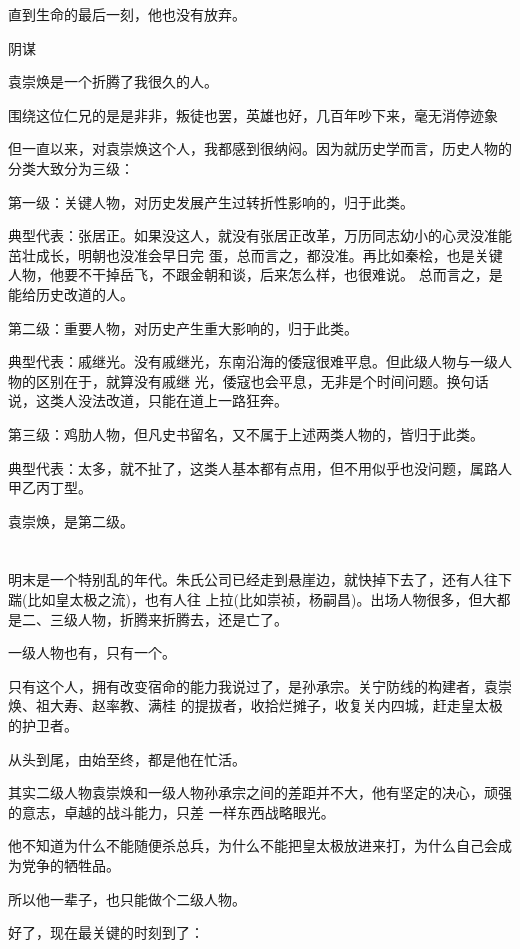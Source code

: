 \documentclass[11pt,a4paper,onecolumn]{article}
\begin{document}
直到生命的最后一刻，他也没有放弃。

阴谋

袁崇焕是一个折腾了我很久的人。

围绕这位仁兄的是是非非，叛徒也罢，英雄也好，几百年吵下来，毫无消停迹象

但一直以来，对袁崇焕这个人，我都感到很纳闷。因为就历史学而言，历史人物的分类大致分为三级：

第一级：关键人物，对历史发展产生过转折性影响的，归于此类。

典型代表：张居正。如果没这人，就没有张居正改革，万历同志幼小的心灵没准能茁壮成长，明朝也没准会早日完
蛋，总而言之，都没准。再比如秦桧，也是关键人物，他要不干掉岳飞，不跟金朝和谈，后来怎么样，也很难说。
总而言之，是能给历史改道的人。

第二级：重要人物，对历史产生重大影响的，归于此类。

典型代表：戚继光。没有戚继光，东南沿海的倭寇很难平息。但此级人物与一级人物的区别在于，就算没有戚继
光，倭寇也会平息，无非是个时间问题。换句话说，这类人没法改道，只能在道上一路狂奔。

第三级：鸡肋人物，但凡史书留名，又不属于上述两类人物的，皆归于此类。

典型代表：太多，就不扯了，这类人基本都有点用，但不用似乎也没问题，属路人甲乙丙丁型。

袁崇焕，是第二级。

\section[\thesection]{}

明末是一个特别乱的年代。朱氏公司已经走到悬崖边，就快掉下去了，还有人往下踹(比如皇太极之流)，也有人往
上拉(比如崇祯，杨嗣昌)。出场人物很多，但大都是二、三级人物，折腾来折腾去，还是亡了。

一级人物也有，只有一个。

只有这个人，拥有改变宿命的能力\myrule 我说过了，是孙承宗。关宁防线的构建者，袁崇焕、祖大寿、赵率教、满桂
的提拔者，收拾烂摊子，收复关内四城，赶走皇太极的护卫者。

从头到尾，由始至终，都是他在忙活。

其实二级人物袁崇焕和一级人物孙承宗之间的差距并不大，他有坚定的决心，顽强的意志，卓越的战斗能力，只差
一样东西\myrule 战略眼光。

他不知道为什么不能随便杀总兵，为什么不能把皇太极放进来打，为什么自己会成为党争的牺牲品。

所以他一辈子，也只能做个二级人物。

好了，现在最关键的时刻到了：
\end{document}
